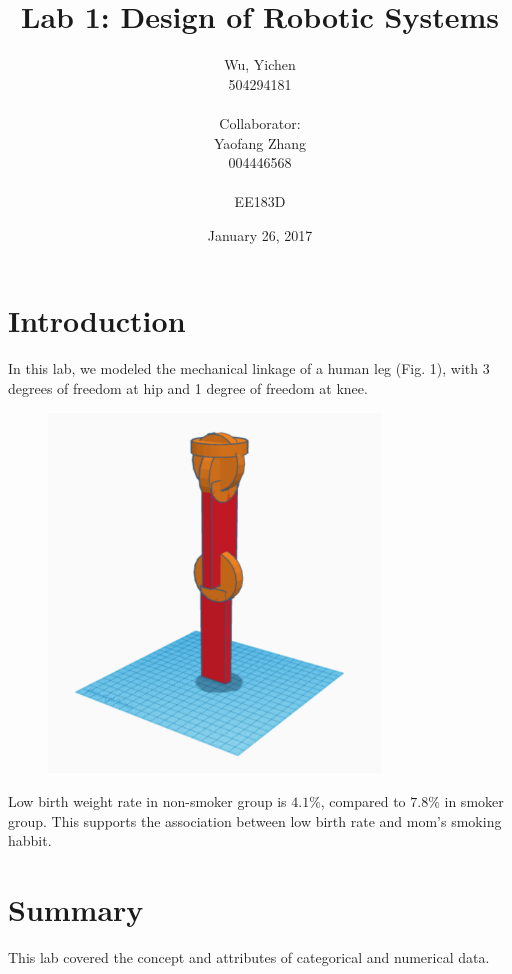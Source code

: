 \documentclass{article}
\begin{document}
\title{Lab 1: Design of Robotic Systems}
\date{January 26, 2017}
\author{Wu, Yichen \\504294181\\  \\Collaborator: \\Yaofang Zhang \\004446568\\ \\EE183D}

\maketitle

\section{Introduction}

In this lab, we modeled the mechanical linkage of a human leg (Fig. 1), with 3 degrees of freedom at hip and 1 degree of freedom at knee. 

\begin{figure}[H]
\centering
\includegraphics[width=250pt]{leg}
\end{figure}

Low birth weight rate in non-smoker group is $4.1\%$, compared to $7.8\%$ in smoker group. This supports the association between low birth rate and mom's smoking habbit.  

\section{Summary}

This lab covered the concept and attributes of categorical and numerical data.  
\end{document}
